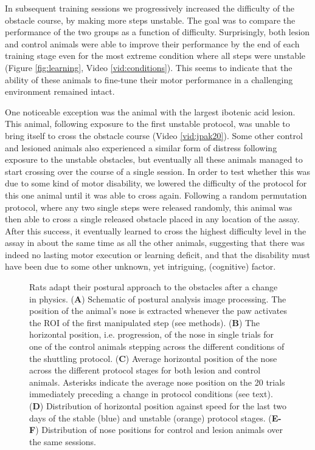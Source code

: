 In subsequent training sessions we progressively increased the difficulty of the obstacle course, by making more steps unstable. The goal was to compare the performance of the two groups as a function of difficulty. Surprisingly, both lesion and control animals were able to improve their performance by the end of each training stage even for the most extreme condition where all steps were unstable (Figure \ref{fig:learning}, Video \ref{vid:conditions}). This seems to indicate that the ability of these animals to fine-tune their motor performance in a challenging environment remained intact.

One noticeable exception was the animal with the largest ibotenic acid lesion. This animal, following exposure to the first unstable protocol, was unable to bring itself to cross the obstacle course (Video \ref{vid:jpak20}). Some other control and lesioned animals also experienced a similar form of distress following exposure to the unstable obstacles, but eventually all these animals managed to start crossing over the course of a single session. In order to test whether this was due to some kind of motor disability, we lowered the difficulty of the protocol for this one animal until it was able to cross again. Following a random permutation protocol, where any two single steps were released randomly, this animal was then able to cross a single released obstacle placed in any location of the assay. After this success, it eventually learned to cross the highest difficulty level in the assay in about the same time as all the other animals, suggesting that there was indeed no lasting motor execution or learning deficit, and that the disability must have been due to some other unknown, yet intriguing, (cognitive) factor.

\begin{figure}
\centering

\caption{Rats adapt their postural approach to the obstacles after a change in physics. (\textbf{A}) Schematic of postural analysis image processing. The position of the animal's nose is extracted whenever the paw activates the ROI of the first manipulated step (see methods). (\textbf{B}) The horizontal position, i.e. progression, of the nose in single trials for one of the control animals stepping across the different conditions of the shuttling protocol. (\textbf{C}) Average horizontal position of the nose across the different protocol stages for both lesion and control animals. Asterisks indicate the average nose position on the 20 trials immediately preceding a change in protocol conditions (see text). (\textbf{D}) Distribution of horizontal position against speed for the last two days of the stable (blue) and unstable (orange) protocol stages. (\textbf{E-F}) Distribution of nose positions for control and lesion animals over the same sessions.}
\label{fig:posture}
\end{figure}

